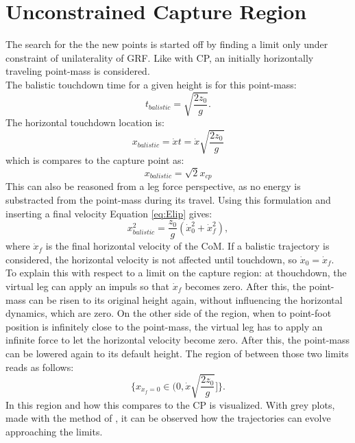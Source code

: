 \section{Unconstrained Capture Region}
The search for the the new points is started off by finding a limit only under constraint of unilaterality of \ac{GRF}. Like with \ac{CP}, an initially horizontally traveling point-mass is considered. \\
The balistic touchdown time for a given height is for this point-mass:
\begin{equation}\label{eq:tbal}
	t_{balistic} = \sqrt{\frac{2z_0}{g}}.
\end{equation}
The horizontal touchdown location is:
\begin{equation}
	x_{balistic}= \dot{x}t=\dot{x}\sqrt{\frac{2z_0}{g}} 
\end{equation}
which is compares to the capture point as:
\begin{equation}
    x_{balistic}=\sqrt{2}x_{cp}
\end{equation}
This can also be reasoned from a leg force perspective, as no energy is substracted from the point-mass during its travel. Using this formulation and inserting a final velocity Equation \eqref{eq:Elip} gives:
\begin{equation}
   x_{balistic}^2 = \frac{z_0}{g}(\dot{x}_0^2 + \dot{x}_f^2), 
\end{equation}
where $\dot{x}_f$ is the final horizontal velocity of the \ac{CoM}. If a balistic trajectory is considered, the horizontal velocity is not affected until touchdown, so $\dot{x}_0=\dot{x}_f$. \\
To explain this with respect to a limit on the capture region: at thouchdown, the virtual leg can apply an impuls so that $\dot{x}_f$ becomes zero. After this, the point-mass can be risen to its original height again, without influencing the horizontal dynamics, which are zero. On the other side of the region, when to point-foot position is infinitely close to the point-mass, the virtual leg has to apply an infinite force to let the horizontal velocity become zero. After this, the point-mass can be lowered again to its default height. The region of between those two limits reads as follows:
\begin{equation}
\{x_{\dot{x}_f=0} \in (0, \dot{x}\sqrt{\frac{2z_0}{g}} ]\}.
\end{equation}
In  this region and how this compares to the \ac{CP} is visualized. With grey plots, made with the method of \cite{koolen2016balance}, it can be observed how the trajectories can evolve approaching the limits. 

